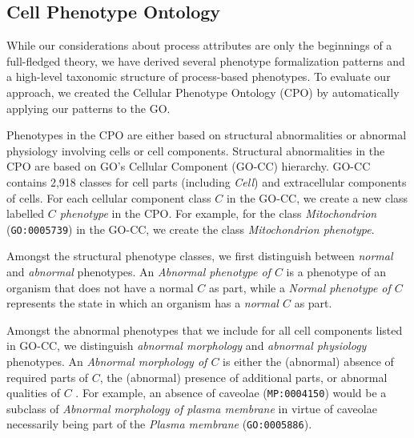 \documentclass[12pt]{article}
\renewcommand{\cite}{\citep}
\begin{document}

\subsection{Cell Phenotype Ontology}
While our considerations about process attributes are only the
beginnings of a full-fledged theory, we have derived several phenotype
formalization patterns and a high-level taxonomic structure of
process-based phenotypes. To evaluate our approach, we created the
Cellular Phenotype Ontology (CPO) by automatically applying our
patterns to the GO.

Phenotypes in the CPO are either based on structural abnormalities or
abnormal physiology involving cells or cell components. Structural
abnormalities in the CPO are based on GO's Cellular Component (GO-CC)
hierarchy. GO-CC contains 2,918 classes for cell parts (including {\em
  Cell}) and extracellular components of cells. For each cellular
component class $C$ in the GO-CC, we create a new class labelled {\em
  $C$ phenotype} in the CPO. For example, for the class {\em
  Mitochondrion} ({\tt GO:0005739}) in the GO-CC, we create the class
{\em Mitochondrion phenotype}.

Amongst the structural phenotype classes, we first distinguish between
{\em normal} and {\em abnormal} phenotypes. An {\em Abnormal phenotype
  of $C$} is a phenotype of an organism that does not have a normal
$C$ as part, while a {\em Normal phenotype of $C$} represents the
state in which an organism has a {\em normal $C$} as part.

Amongst the abnormal phenotypes that we include for all cell
components listed in GO-CC, we distinguish {\em abnormal morphology}
and {\em abnormal physiology} phenotypes. An {\em Abnormal morphology
  of $C$} is either the (abnormal) absence of required parts of $C$,
the (abnormal) presence of additional parts, or abnormal qualities of
$C$ \cite{Hoehndorf2010phene}. For example, an absence of caveolae
({\tt MP:0004150}) would be a subclass of {\em Abnormal morphology of
  plasma membrane} in virtue of caveolae necessarily being part of the
{\em Plasma membrane} ({\tt GO:0005886}).
\end{document}
